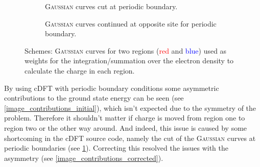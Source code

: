 \begin{figure}
	\centering
	\begin{subfigure}{0.45\textwidth}
		\centering
		\caption{\textsc{Gaussian} curves cut at periodic boundary.\\}
	\end{subfigure}\hspace*{1cm}
	\begin{subfigure}{0.45\textwidth}
		\centering
		\caption{\textsc{Gaussian} curves continued at opposite site for periodic boundary.}
	\end{subfigure}
	\caption{Schemes: \textsc{Gaussian} curves for two regions (\textcolor{red}{red} and \textcolor{blue}{blue}) used as weights for the integration/summation over the electron density to calculate the charge in each region.}
	\label{image_periodicity_gaussians}
\end{figure}
By using cDFT with periodic boundary conditions some asymmetric contributions to the ground state energy can be seen (see \cref{image_contributions_initial}), which isn't expected due to the symmetry of the problem. Therefore it shouldn't matter if charge is moved from region one to region two or the other way around. And indeed, this issue is caused by some shortcoming in the cDFT source code, namely the cut of the \textsc{Gaussian} curves at periodic boundaries (see \cref{image_periodicity_gaussians}). Correcting this resolved the issues with the asymmetry (see \cref{image_contributions_corrected}).\\
